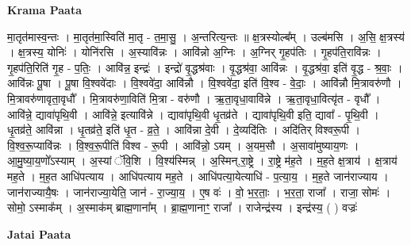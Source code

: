 \documentclass[17pt]{extarticle}
\begin{document}
\textbf{Krama Paata} \newline

मा॒तृत॑मास्व॒न्तः । मा॒तृत॑मा॒स्विति॑ मा॒तृ - त॒मा॒सु॒ । अ॒न्तरित्य॒न्तः ॥ क्ष॒त्रस्योल्ब᳚म् । उल्ब॑मसि । अ॒सि॒ क्ष॒त्रस्य॑ । क्ष॒त्रस्य॒ योनिः॑ । योनि॑रसि । अ॒स्यावि॑न्नः । आवि॑न्नो अ॒ग्निः । अ॒ग्निर् गृ॒हप॑तिः । गृ॒हप॑ति॒रावि॑न्नः । गृ॒हप॑ति॒रिति॑ गृ॒ह - प॒तिः॒ । आवि॑न्न॒ इन्द्रः॑ । इन्द्रो॑ वृ॒द्धश्र॑वाः । वृ॒द्धश्र॑वा॒ आवि॑न्नः । वृ॒द्धश्र॑वा॒ इति॑ वृ॒द्ध - श्र॒वाः॒ । आवि॑न्नः पू॒षा । पू॒षा वि॒श्ववे॑दाः । वि॒श्ववे॑दा॒ आवि॑न्नौ । वि॒श्ववे॑दा॒ इति॑ वि॒श्व - वे॒दाः॒ । आवि॑न्नौ मि॒त्रावरु॑णौ । मि॒त्रावरु॑णावृता॒वृधौ᳚ । मि॒त्रावरु॑णा॒विति॑ मि॒त्रा - वरु॑णौ । ऋ॒ता॒वृधा॒वावि॑न्ने । ऋ॒ता॒वृधा॒वित्यृ॑त - वृधौ᳚ । आवि॑न्ने॒ द्यावा॑पृथि॒वी । आवि॑न्ने॒ इत्यावि॑न्ने । द्यावा॑पृथि॒वी धृ॒तव्र॑ते । द्यावा॑पृथि॒वी इति॒ द्यावा᳚ - पृ॒थि॒वी । धृ॒तव्र॑ते॒ आवि॑न्ना । धृ॒तव्र॑ते॒ इति॑ धृ॒त - व्र॒ते॒ । आवि॑न्ना दे॒वी । दे॒व्यदि॑तिः । अदि॑तिर् विश्वरू॒पी । वि॒श्व॒रू॒प्यावि॑न्नः । वि॒श्व॒रू॒पीति॑ विश्व - रू॒पी । आवि॑न्नो॒ ऽयम् । अ॒यम॒सौ । अ॒सावा॑मुष्याय॒णः । आ॒मु॒ष्या॒य॒णो᳚ऽस्याम् । अ॒स्यां ॅवि॒शि । वि॒श्य॑स्मिन्न् । अ॒स्मिन्,रा॒ष्ट्रे । रा॒ष्ट्रे म॑ह॒ते । म॒ह॒ते क्ष॒त्राय॑ । क्ष॒त्राय॑ मह॒ते । म॒ह॒त आधि॑पत्याय । आधि॑पत्याय मह॒ते । आधि॑पत्या॒येत्याधि॑ - प॒त्या॒य॒ । म॒ह॒ते जान॑राज्याय । जान॑राज्यायै॒षः । जान॑राज्या॒येति॒ जान॑ - रा॒ज्या॒य॒ । ए॒ष वः॑ । वो॒ भ॒र॒ताः॒ । भ॒र॒ता॒ राजा᳚ । राजा॒ सोमः॑ । सोमो॒ ऽस्माक᳚म् । अ॒स्माक॑म् ब्राह्म॒णाना᳚म् । ब्रा॒ह्म॒णानाꣳ॒॒ राजा᳚ । राजेन्द्र॑स्य । इन्द्र॑स्य॒ ( ) वज्रः॑ \newline

\textbf{Jatai Paata} \newline
\end{document}
